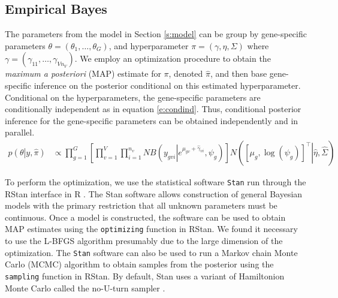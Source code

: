 \documentclass[useAMS,usenatbib,referee]{biom}
\begin{document}
\subsection{Empirical Bayes}
\label{s:ebayes}

The parameters from the model in Section \ref{s:model} can be group by gene-specific parameters $\theta = (\theta_1,\ldots,\theta_G)$, and hyperparameter $\pi = (\gamma,\eta, \Sigma)$ where $\gamma = (\gamma_{11},\ldots,\gamma_{Vn_V})$. We employ an optimization procedure to obtain the \emph{maximum a posteriori} (MAP) estimate for $\pi$, denoted $\hat{\pi}$, and then base gene-specific inference on the posterior conditional on this estimated hyperparameter. Conditional on the hyperparameters, the gene-specific parameters are conditionally independent as in equation \eqref{e:condind}. Thus, conditional posterior inference for the gene-specific parameters can be obtained independently and in parallel.
\begin{align}
p\left(\theta\left|y,\hat{\pi}\right.\right) 
&\propto \prod_{g=1}^G \left[ \prod_{v=1}^V \prod_{i=1}^{n_v} NB\left(y_{gvi}\left|e^{\mu_{gv}+\hat{\gamma}_{vi}},\psi_g\right.\right) \right] N\left(\left.\left[\mu_g, \log(\psi_g) \right]^\top\right|\hat{\eta}, \hat{\Sigma} \right) 
\label{e:condind}
\end{align}


To perform the optimization, we use the statistical software {\tt Stan} \citep{stan-software:2014} run through the RStan interface \citep{rstan-software:2014} in R \citep{R2014}. The Stan software allows construction of general Bayesian models with the primary restriction that all unknown parameters must be continuous. Once a model is constructed, the software can be used to obtain MAP estimates \cite[Section 50.3,][]{stan-manual:2014} using the {\tt optimizing} function in RStan. We found it necessary to use the L-BFGS algorithm \cite[Section 55,][]{stan-manual:2014} presumably due to the large dimension of the optimization. The {\tt Stan} software can also be used to run a Markov chain Monte Carlo (MCMC) algorithm to obtain samples from the posterior using the {\tt sampling} function in RStan. By default, Stan uses a variant of Hamiltonion Monte Carlo \citep{neal2011mcmc} called the no-U-turn sampler \citep{hoffman2013no}. 
\end{document}
